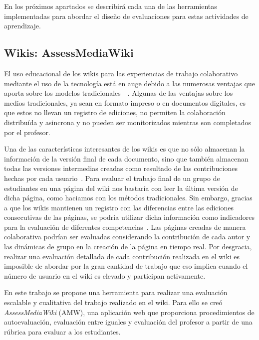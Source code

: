 En los próximos apartados se describirá cada una de las herramientas implementadas para abordar el diseño de evaluaciones para estas actividades de aprendizaje.

\subsection{Wikis: AssessMediaWiki}

El uso educacional de los wikis para las experiencias de trabajo colaborativo mediante el uso de la tecnología está en auge debido a las numerosas ventajas que aporta sobre los modelos tradicionales~~\cite{elgort2008wiki}. Algunas de las ventajas sobre los medios tradicionales, ya sean en formato impreso o en documentos digitales, es que estos no llevan un registro de ediciones, no permiten la colaboración distribuída y asincrona y no pueden ser monitorizados mientras son completados por el profesor.

Una de las características interesantes de los wikis es que no sólo almacenan la información de la versión final de cada documento, sino que también almacenan todas las versiones intermedias creadas como resultado de las contribuciones hechas por cada usuario~\cite{trentin2009using}. Para evaluar el trabajo final de un grupo de estudiantes en una página del wiki nos bastaría con leer la última versión de dicha página, como haciamos con los métodos tradicionales. Sin embargo, gracias a que los wikis mantienen un registro con las diferencias entre las ediciones consecutivas de las páginas, se podria utilizar dicha información como indicadores para la evaluación de diferentes competencias~\cite{ortega2011new}. Las páginas creadas de manera colaborativa podrían ser evaluadas considerando la contribución de cada autor y las dinámicas de grupo en la creación de la página en tiempo real. Por desgracia, realizar una evaluación detallada de cada contribución realizada en el wiki es imposible de abordar por la gran cantidad de trabajo que eso implica cuando el número de usuario en el wiki es elevado y participan activamente.

En este trabajo se propone una herramienta para realizar una evaluación escalable y cualitativa del trabajo realizado en el wiki. Para ello se creó \emph{AssessMediaWiki} (AMW), una aplicación web que proporciona procedimientos de autoevaluación, evaluación entre iguales y evaluación del profesor a partir de una rúbrica para evaluar a los estudiantes.

